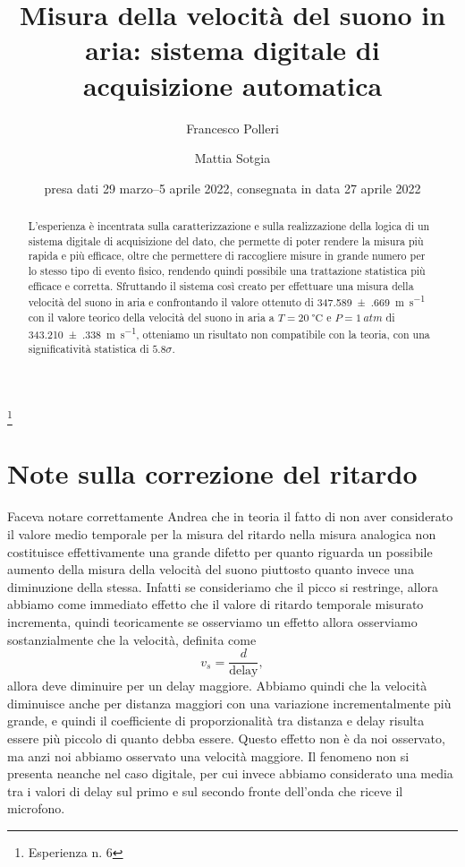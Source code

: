 \documentclass[fleqn]{memo}
\begin{document}
\title{
    Misura della velocità del suono in aria: sistema digitale di acquisizione automatica
}
\thanks{Esperienza n. 6
}

\author{Francesco Polleri}
\author{Mattia Sotgia}


\date{presa dati
    29 marzo--5 aprile 2022, consegnata in data
    27 aprile 2022
}
\revised{\today}

\begin{abstract}
    L'esperienza è incentrata sulla caratterizzazione e sulla realizzazione della logica di un sistema digitale di acquisizione del dato, che permette di poter rendere la misura più rapida e più efficace, oltre che permettere di raccogliere misure in grande numero per lo stesso tipo di evento fisico, rendendo quindi possibile una trattazione statistica più efficace e corretta. Sfruttando il sistema così creato per effettuare una misura della velocità del suono in aria e confrontando il valore ottenuto di \SI{347.589(669)}{\metre\per\second} con il valore teorico della velocità del suono in aria a $T=\SI{20}{\celsius}$ e $P=\SI{1}{atm}$ di \SI{343.210(338)}{\metre\per\second}, otteniamo un risultato non compatibile con la teoria, con una significatività statistica di $5.8\sigma$.
\end{abstract}

\maketitle


\section{Note sulla correzione del ritardo}

Faceva notare correttamente Andrea che in teoria il fatto di non aver considerato il valore medio temporale per la misura del ritardo nella misura analogica non costituisce effettivamente una grande difetto per quanto riguarda un possibile aumento della misura della velocità del suono piuttosto quanto invece una diminuzione della stessa. Infatti se consideriamo che il picco si restringe, allora abbiamo come immediato effetto che il valore di ritardo temporale misurato incrementa, quindi teoricamente se osserviamo un effetto allora osserviamo sostanzialmente che la velocità, definita come \[v_s = \frac{d}{\text{delay}}, \] allora deve diminuire per un delay maggiore. Abbiamo quindi che la velocità diminuisce anche per distanza maggiori con una variazione incrementalmente più grande, e quindi il coefficiente di proporzionalità tra distanza e delay risulta essere più piccolo di quanto debba essere. Questo effetto non è da noi osservato, ma anzi noi abbiamo osservato una velocità maggiore. 
Il fenomeno non si presenta neanche nel caso digitale, per cui invece abbiamo considerato una media tra i valori di delay sul primo e sul secondo fronte dell'onda che riceve il microfono.  
\end{document}
